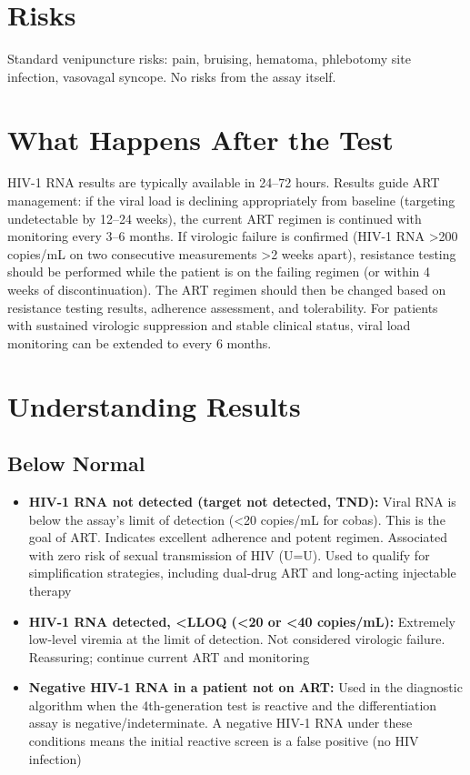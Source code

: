 \section*{Risks}
Standard venipuncture risks: pain, bruising, hematoma, phlebotomy site infection, vasovagal syncope. No risks from the assay itself.

\section*{What Happens After the Test}
HIV-1 RNA results are typically available in 24--72 hours. Results guide ART management: if the viral load is declining appropriately from baseline (targeting undetectable by 12--24 weeks), the current ART regimen is continued with monitoring every 3--6 months. If virologic failure is confirmed (HIV-1 RNA >200 copies/mL on two consecutive measurements >2 weeks apart), resistance testing should be performed while the patient is on the failing regimen (or within 4 weeks of discontinuation). The ART regimen should then be changed based on resistance testing results, adherence assessment, and tolerability. For patients with sustained virologic suppression and stable clinical status, viral load monitoring can be extended to every 6 months.

\section*{Understanding Results}

\subsection*{Below Normal}
\begin{itemize}
  \item \textbf{HIV-1 RNA not detected (target not detected, TND):} Viral RNA is below the assay's limit of detection (<20 copies/mL for cobas). This is the goal of ART. Indicates excellent adherence and potent regimen. Associated with zero risk of sexual transmission of HIV (U=U). Used to qualify for simplification strategies, including dual-drug ART and long-acting injectable therapy
  \item \textbf{HIV-1 RNA detected, <LLOQ (<20 or <40 copies/mL):} Extremely low-level viremia at the limit of detection. Not considered virologic failure. Reassuring; continue current ART and monitoring
  \item \textbf{Negative HIV-1 RNA in a patient not on ART:} Used in the diagnostic algorithm when the 4th-generation test is reactive and the differentiation assay is negative/indeterminate. A negative HIV-1 RNA under these conditions means the initial reactive screen is a false positive (no HIV infection)
\end{itemize}


